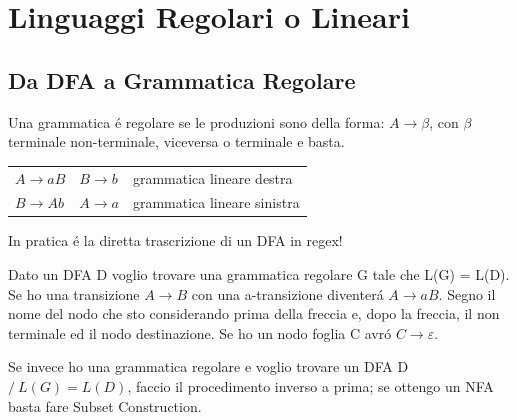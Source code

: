 \chapter{Linguaggi Regolari o Lineari}

\section{Da DFA a Grammatica Regolare}

Una grammatica \'e regolare se le produzioni sono della forma: $A \rightarrow \beta$, con $\beta$ terminale non-terminale, viceversa o 
terminale e basta.\\[5pt]

\begin{center}
    \begin{tabular}{lll}
        $A \rightarrow aB$     &    $B \rightarrow b$   &   grammatica lineare destra\\
        $B \rightarrow Ab$     &    $A \rightarrow a$   &   grammatica lineare sinistra\\
    \end{tabular}
\end{center}

\begin{tcolorbox}\begin{center}
    In pratica \'e la diretta trascrizione di un DFA in regex!
\end{center}\end{tcolorbox}

Dato un DFA D voglio trovare una grammatica regolare G tale che L(G) = L(D). 
Se ho una transizione $A \rightarrow B$ con una a-transizione diventer\'a $A \rightarrow aB$. Segno il nome del nodo che sto considerando
prima della freccia e, dopo la freccia, il non terminale ed il nodo destinazione. Se ho un nodo foglia C avr\'o  $C \rightarrow \varepsilon$.

Se invece ho una grammatica regolare e voglio trovare un DFA D $/\ L(G) = L(D)$, faccio il procedimento inverso a prima;
se ottengo un NFA basta fare Subset Construction.

